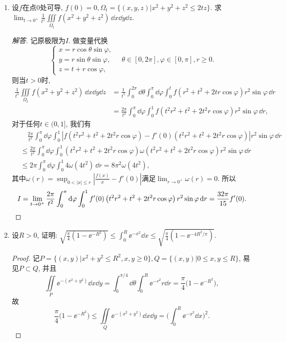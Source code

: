 \begin{quiza}
\begin{enumerate}
\item 设\(f\)在点\(0\)处可导, \(f(0)=0,\varOmega_t=\{(x,y,z)\big|x^2+y^2+z^2\leqslant 2tz\}\).
求\(\lim_{t\rightarrow 0^+}\frac{1}{t^5}\iiint\limits_{\varOmega_t}f(x^2+y^2+z^2)\,\dd x\dd y\dd z\).
\begin{proof}[解答]
记原极限为\(I\). 做变量代换\[\begin{cases}
x=r\cos\theta\sin\varphi,\\
y=r\sin\theta\sin\varphi,\\
z=t+r\cos\varphi,
\end{cases}\quad\theta\in[0,2\pi],\varphi\in[0,\pi],r\geqslant 0.\]
则当\(t>0\)时,\[\begin{split}
\frac{1}{t^5}\iiint\limits_{\varOmega_t}f(x^2+y^2+z^2)\,\dd x\dd y\dd z
&=\frac{1}{t^5}\int_{0}^{2\pi}\dd\theta\int_{0}^{\pi}\dd\varphi\int_{0}^{t}f(r^2+t^2+2tr\cos\varphi)r^2\sin\varphi\,\dd r\\
&=\frac{2\pi}{t^2}\int_{0}^{\pi}\dd\varphi\int_{0}^{1}f(t^2r^2+t^2+2t^2r\cos\varphi)r^2\sin\varphi\,\dd r,
\end{split}\]
对于任何\(t\in(0,1]\), 我们有\[\begin{split}
&\quad\frac{2\pi}{t^2}\int_{0}^{\pi}\dd\varphi\int_{0}^{1}\left|f(t^2r^2+t^2+2t^2r\cos\varphi)-f'(0)(t^2r^2+t^2+2t^2r\cos\varphi)\right|r^2\sin\varphi\,\dd r\\
&\leqslant\frac{2\pi}{t^2}\int_{0}^{\pi}\dd\varphi\int_{0}^{1}(t^2r^2+t^2+2t^2r\cos\varphi)\omega(t^2r^2+t^2+2t^2r\cos\varphi)r^2\sin\varphi\,\dd r\\
&\leqslant2\pi\int_{0}^{\pi}\dd\varphi\int_{0}^{1}4\omega(4t^2)\,\dd r=8\pi^2\omega(4t^2),
\end{split}\]
其中\(\omega(r)=\sup_{0<|x|\leqslant r}\left|\frac{f(x)}{x}-f'(0)\right|\)满足\(\lim_{r\rightarrow0^+}\omega(r)=0.\) 
所以\[I=\lim_{t\rightarrow 0^+}\frac{2\pi}{t^2}\int_{0}^{\pi}\mathrm{d}\varphi\int_{0}^{1}f'(0)\left(t^2r^2+t^2+2t^2r\cos\varphi\right)r^2\sin\varphi\,\mathrm{d} r=\frac{32\pi}{15}f'(0).\qedhere\]
\end{proof}

\item 设\(R>0\), 证明: \(\sqrt{\frac{\pi}{4}(1-\ee^{-R^2})}
\leqslant\int_{0}^{R}\ee^{-x^2}\dd x
\leqslant\sqrt{\frac{\pi}{4}\left(1-\ee^{-4R^2/\pi}\right)}\).
\begin{proof}
记\(P=\{(x,y)\big|x^2+y^2\leqslant R^2,x,y\geqslant 0\},Q=\{(x,y)\big|0\leqslant x,y\leqslant R\}\), 
易见\(P\subset Q\), 并且\[\iint\limits_{P}\ee^{-(x^2+y^2)}\dd x\dd y
=\int_{0}^{\pi/4}\dd\theta\int_{0}^{R}\ee^{-r^2}r\dd r
=\frac{\pi}{4}\big(1-\ee^{-R^2}\big),\]
故\[\frac{\pi}{4}\big(1-\ee^{-R^2}\big)
\leqslant\iint\limits_{Q}\ee^{-(x^2+y^2)}\dd x\dd y
=\bigg(\int_{0}^{R}\ee^{-x^2}\dd x\bigg)^2.\]


\end{proof}
\end{enumerate}
\end{quiza}
